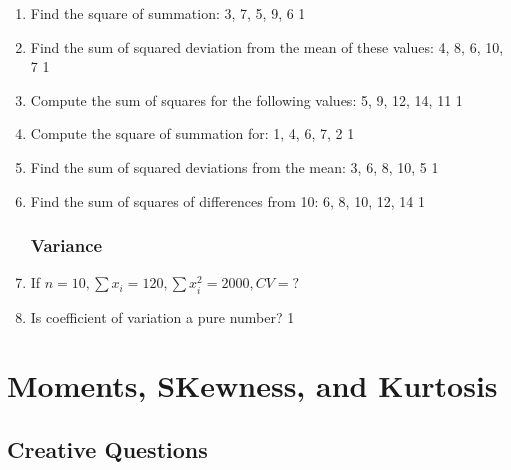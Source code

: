 \documentclass[a4paper,oneside]{book}
\begin{document}
\begin{enumerate}
\item Find the square of summation: 3, 7, 5, 9, 6 \hfill 1  

\item Find the sum of squared deviation from the mean of these values: 4, 8, 6, 10, 7 \hfill 1  

\item Compute the sum of squares for the following values: 5, 9, 12, 14, 11 \hfill 1  

\item Compute the square of summation for: 1, 4, 6, 7, 2 \hfill 1  

\item Find the sum of squared deviations from the mean: 3, 6, 8, 10, 5 \hfill 1  

\item Find the sum of squares of differences from 10: 6, 8, 10, 12, 14 \hfill 1  



\subsection{Variance}
\item If $n=10, \sum x_i = 120, \sum x_i^2=2000, CV=?$
\item Is coefficient of variation a pure number? \hfill 1

\end{enumerate}


\chapter{Moments, SKewness, and Kurtosis} 
\section{Creative Questions}
\end{document}

